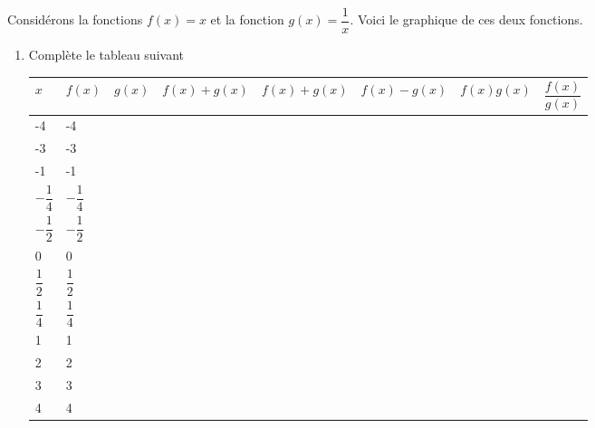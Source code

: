 \documentclass[a4paper,12pt]{report}
\begin{document}
\begin{exemple}
Considérons la fonctions \(f(x)=x\) et la fonction \(g(x)=\dfrac{1}{x}\). Voici le
graphique de ces deux fonctions.
\begin{center}

\end{center}
\begin{enumerate}
\item Complète le tableau suivant
\begin{center}
\begin{tabular}{|l|l|l|l|l|l|l|l|}
\hline
$x$             & $f(x)$          & $g(x)$ & $f(x)+g(x)$ & $f(x)+g(x)$ & $f(x)-g(x)$ & $f(x)g(x)$ & $\dfrac{f(x)}{g(x)}$ \\ \hline
-4              & -4              &        &             &             &             &            &                      \\ \hline
-3              & -3              &        &             &             &             &            &                      \\ \hline
-1              & -1              &        &             &             &             &            &                      \\ \hline
$-\dfrac{1}{4}$ & $-\dfrac{1}{4}$ &        &             &             &             &            &                      \\ \hline
$-\dfrac{1}{2}$ & $-\dfrac{1}{2}$ &        &             &             &             &            &                      \\ \hline
0               & 0               &        &             &             &             &            &                      \\ \hline
$\dfrac{1}{2}$  & $\dfrac{1}{2}$  &        &             &             &             &            &                      \\ \hline
$\dfrac{1}{4}$  & $\dfrac{1}{4}$  &        &             &             &             &            &                      \\ \hline
1               & 1               &        &             &             &             &            &                      \\ \hline
2               & 2               &        &             &             &             &            &                      \\ \hline
3               & 3               &        &             &             &             &            &                      \\ \hline
4               & 4               &        &             &             &             &            &                      \\ \hline
\end{tabular}
\end{center}


\end{enumerate}
\end{exemple}
\end{document}
